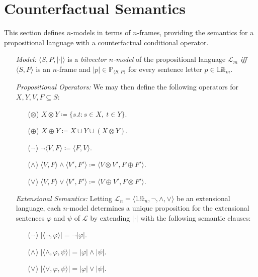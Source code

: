 \documentclass[a4paper, 11pt]{article} %
\newcommand{\tuple}[1]{\langle#1\rangle} %
\newcommand{\set}[1]{\lbrace#1\rbrace} %
\renewcommand{\P}[0]{\mathbb{P}}
\newcommand{\Lit}[0]{\mathbb{Lit}}
\renewcommand{\L}[0]{\mathcal{L}}
\renewcommand{\Vert}[1]{\ldbrack#1\rdbrack}
\renewcommand{\vert}[1]{\lvert#1\rvert}
\begin{document}
\section{Counterfactual Semantics}

This section defines $n$-models in terms of $n$-frames, providing the semantics for a propositional language with a counterfactual conditional operator.

\begin{enumerate}
  \item[\it Model:] $\tuple{S,P,\vert{\cdot}}$ is a \textit{bitvector $n$-model} of the propositional language $\L_m$ \textit{iff} $\tuple{S,P}$ is an $n$-frame and $\vert{p}\in\P_{\tuple{S,P}}$ for every sentence letter $p\in\Lit_m$.
  \item[\it Propositional Operators:] We may then define the following operators for $X,Y,V,F\subseteq S$:
    \begin{itemize}
      \item[($\otimes$)] $X \otimes Y \coloneq \set{s.t : s \in X,\ t \in Y}$.
      \item[($\oplus$)] $X \oplus Y \coloneq X \cup Y \cup (X \otimes Y)$.
      \item[($\neg$)] $\neg\tuple{V,F} \coloneq \tuple{F,V}$.
      \item[($\wedge$)] $\tuple{V,F}\wedge\tuple{V',F'} \coloneq \tuple{V\otimes V',F\oplus F'}$.
      \item[($\vee$)] $\tuple{V,F}\vee\tuple{V',F'} \coloneq \tuple{V\oplus V',F\otimes F'}$.
    \end{itemize}
  \item[\it Extensional Semantics:] Letting $\L_n=\tuple{\Lit_n,\neg,\wedge,\vee}$ be an extensional language, each $n$-model determines a unique proposition for the extensional sentences $\varphi$ and $\psi$ of $\L$ by extending $\vert{\cdot}$ with the following semantic clauses: 
    \begin{itemize}
      \item[($\neg$)] $\vert{\tuple{\neg,\varphi}}=\neg\vert{\varphi}$.
      \item[($\wedge$)] $\vert{\tuple{\wedge,\varphi,\psi}}=\vert{\varphi}\wedge\vert{\psi}$.
      \item[($\vee$)] $\vert{\tuple{\vee,\varphi,\psi}}=\vert{\varphi}\vee\vert{\psi}$.
    \end{itemize}

\end{enumerate}
\end{document}
